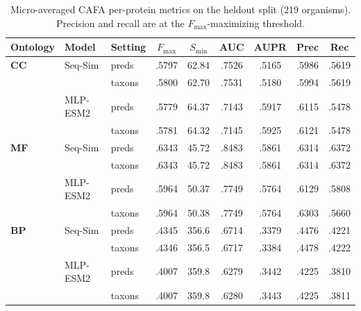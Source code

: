 \begin{table}[!h]
\centering
\caption{Micro-averaged CAFA per-protein metrics on the heldout split (219 organisms). Precision and recall are at the $F_{\max}$-maximizing threshold.}
\label{tab:micro-avg-preds-opt-heldout}
\small
\setlength{\tabcolsep}{4pt}
\begin{tabular}{lll*{6}c}
\toprule
Ontology & Model & Setting & $F_{\max}$ & $S_{\min}$ & AUC & AUPR & Prec & Rec \\
\midrule
\textbf{CC} & Seq-Sim   & preds & .5797 & 62.84 & .7526 & .5165 & .5986 & .5619 \\
            &           & taxons & .5800 & 62.70 & .7531 & .5180 & .5994 & .5619 \\
            & MLP-ESM2  & preds & .5779 & 64.37 & .7143 & .5917 & .6115 & .5478 \\
            &           & taxons & .5781 & 64.32 & .7145 & .5925 & .6121 & .5478 \\
\midrule
\textbf{MF} & Seq-Sim   & preds & .6343 & 45.72 & .8483 & .5861 & .6314 & .6372 \\
            &           & taxons & .6343 & 45.72 & .8483 & .5861 & .6314 & .6372 \\
            & MLP-ESM2  & preds & .5964 & 50.37 & .7749 & .5764 & .6129 & .5808 \\
            &           & taxons & .5964 & 50.38 & .7749 & .5764 & .6303 & .5660 \\
\midrule
\textbf{BP} & Seq-Sim   & preds & .4345 & 356.6 & .6714 & .3379 & .4476 & .4221 \\
            &           & taxons & .4346 & 356.5 & .6717 & .3384 & .4478 & .4222 \\
            & MLP-ESM2  & preds & .4007 & 359.8 & .6279 & .3442 & .4225 & .3810 \\
            &           & taxons & .4007 & 359.8 & .6280 & .3443 & .4225 & .3811 \\
\bottomrule
\end{tabular}
\end{table}
